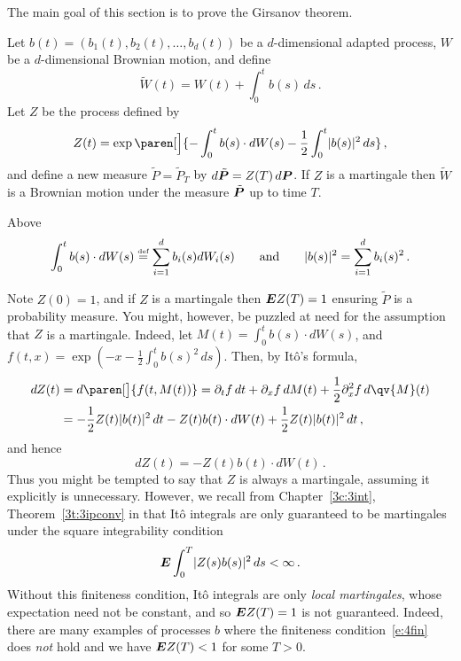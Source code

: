The main goal of this section is to prove the Girsanov theorem.
\begin{theorem}\label{t:4girsanov}
  Let $b(t) = (b_1(t), b_2(t), \dots, b_d(t))$ be a $d$-dimensional adapted process, $W$ be a $d$-dimensional Brownian motion, and define
  \begin{equation*}
    \tilde W(t) = W(t) + \int_0^t b(s) \, ds\,.
  \end{equation*}
  Let $Z$ be the process defined by
  \begin{equation*}
    Z(t) = \exp\paren[\Big]{ -\int_0^t b(s) \cdot dW(s) - \frac{1}{2}\int_0^t \abs{b(s)}^2 \, ds}\,,
  \end{equation*}
  and define a new measure $\tilde P = \tilde P_T$ by $d\tilde\P = Z(T) \, d\P$.
  If $Z$ is a martingale then $\tilde W$ is a Brownian motion under the measure $\tilde \P$ up to time $T$.
\end{theorem}
\begin{remark}
  Above
  \begin{equation*}
    \int_0^t b(s) \cdot dW(s) \defeq \sum_{i=1}^{d} b_i(s) dW_i(s)
    \qquad\text{and}\qquad
    \abs{b(s)}^2 = \sum_{i=1}^{d} b_i(s)^2\,.
  \end{equation*}
\end{remark}
\begin{remark}
  Note $Z(0) = 1$, and if $Z$ is a martingale then $\E Z(T) = 1$ ensuring $\tilde P$ is a probability measure.
  You might, however, be puzzled at need for the assumption that $Z$ is a martingale.
  Indeed, let $M(t) = \int_0^t b(s) \cdot dW(s)$, and $f(t, x) = \exp(-x - \frac{1}{2} \int_0^t b(s)^2 \, ds )$.
  Then, by It\^o's formula,
  \begin{align*}
    dZ(t)
      &= d\paren[\big]{ f(t, M(t)) }
      = \partial_t f \, dt + \partial_x f \, dM(t)  + \frac{1}{2} \partial_x^2 f \, d\qv{M}(t)
    \\
      &= -\frac{1}{2} Z(t) \abs{b(t)}^2 \, dt
	-Z(t) b(t) \cdot dW(t) 
	+ \frac{1}{2} Z(t) \abs{b(t)}^2 \, dt\,,
  \end{align*}
  and hence
  \begin{equation}\label{e:4dz}
      dZ(t) = -Z(t) b(t) \cdot dW(t)\,.
  \end{equation}
  Thus you might be tempted to say that $Z$ is always a martingale, assuming it explicitly is unnecessary.
  However, we recall from Chapter~\ref{3c:3int}, Theorem~\ref{3t:3ipconv} in that It\^o integrals are only guaranteed to be martingales under the square integrability condition
  \begin{equation}\label{e:4fin}
    \E \int_0^T \abs{Z(s) b(s)}^2 \, ds < \infty\,.
  \end{equation}
  Without this finiteness condition, It\^o integrals are only \emph{local martingales}, whose expectation need not be constant, and so $\E Z(T) = 1$ is not guaranteed.
  Indeed, there are many examples of processes $b$ where the finiteness condition~\eqref{e:4fin} does \emph{not} hold and we have $\E Z(T) < 1$ for some $T > 0$.
\end{remark}

